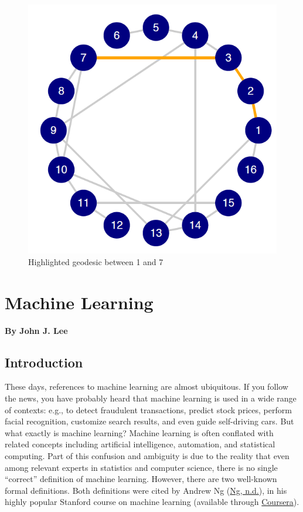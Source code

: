 \documentclass{book}
\begin{document}
\begin{figure}
\centering
\includegraphics{images/social-networks/11-16.png}
\caption{Highlighted geodesic between 1 and 7}
\end{figure}

\hypertarget{machine-learning}{%
\chapter{Machine Learning}\label{machine-learning}}

\textbf{By John J. Lee}

\hypertarget{introduction-9}{%
\section{Introduction}\label{introduction-9}}

These days, references to machine learning are almost ubiquitous. If you
follow the news, you have probably heard that machine learning is used in a
wide range of contexts: e.g., to detect fraudulent transactions, predict stock
prices, perform facial recognition, customize search results, and even guide
self-driving cars. But what exactly is machine learning? Machine learning is
often conflated with related concepts including artificial intelligence,
automation, and statistical computing. Part of this confusion and ambiguity is
due to the reality that even among relevant experts in statistics and computer
science, there is no single ``correct'' definition of machine learning.
However, there are two well-known formal definitions. Both definitions were
cited by Andrew Ng (\protect\hyperlink{ref-ng-a}{Ng, n.d.}), in his highly
popular Stanford course on machine learning (available through
\href{https://www.coursera.org/learn/machine-learning}{Coursera}).
\end{document}
